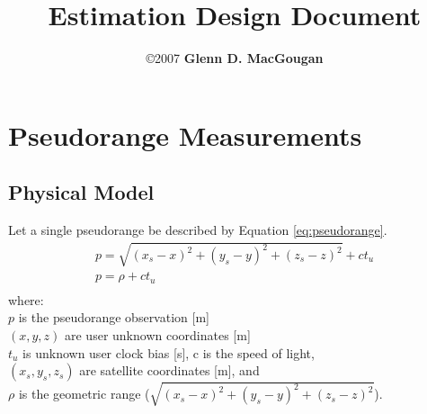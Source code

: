 \documentclass[11pt,letterpaper]{article}
\begin{document}
\title{\Huge {Estimation Design Document}}
\author{\copyright 2007 \textbf{Glenn D. MacGougan}}
\date{}

\maketitle

\pagebreak

\section{Pseudorange Measurements}

\subsection{Physical Model}

Let a single pseudorange be described by Equation \ref{eq:pseudorange}.
\begin{equation} \label{eq:pseudorange}
\begin{array}{l}
p = \sqrt{(x_s-x)^2 + (y_s-y)^2 + (z_s-z)^2} + ct_u \\
p = \rho + ct_u \\
\end{array}
\end{equation}
where: \\
$p$ is the pseudorange observation [m] \\
$(x,y,z)$ are user unknown coordinates [m] \\
$t_u$ is unknown user clock bias [s], c is the speed of light, \\
$(x_s,y_s,z_s)$ are satellite coordinates [m], and \\
$\rho$ is the geometric range ($\sqrt{(x_s-x)^2 + (y_s-y)^2 + (z_s-z)^2}$). \\
\end{document}

